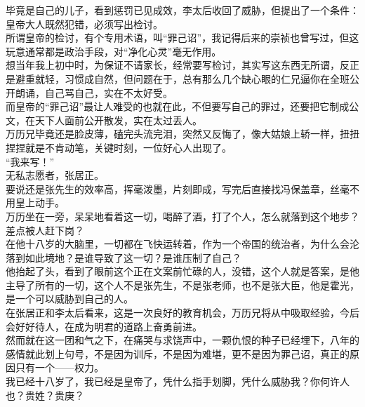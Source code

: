 \begin{multicols}{\theparacolNo}
毕竟是自己的儿子，看到惩罚已见成效，李太后收回了威胁，但提出了一个条件：皇帝大人既然犯错，必须写出检讨。\\

所谓皇帝的检讨，有个专用术语，叫“罪己诏”，我记得后来的崇祯也曾写过，但这玩意通常都是政治手段，对“净化心灵”毫无作用。\\

想当年我上初中时，为保证不请家长，经常要写检讨，其实写这东西无所谓，反正是避重就轻，习惯成自然，但问题在于，总有那么几个缺心眼的仁兄逼你在全班公开朗诵，自己骂自己，实在不太好受。\\

而皇帝的“罪己诏”最让人难受的也就在此，不但要写自己的罪过，还要把它制成公文，在天下人面前公开散发，实在太过丢人。\\

万历兄毕竟还是脸皮薄，磕完头流完泪，突然又反悔了，像大姑娘上轿一样，扭扭捏捏就是不肯动笔，关键时刻，一位好心人出现了。\\

“我来写！”\\

无私志愿者，张居正。\\

要说还是张先生的效率高，挥毫泼墨，片刻即成，写完后直接找冯保盖章，丝毫不用皇上动手。\\

万历坐在一旁，呆呆地看着这一切，喝醉了酒，打了个人，怎么就落到这个地步？差点被人赶下岗？\\

在他十八岁的大脑里，一切都在飞快运转着，作为一个帝国的统治者，为什么会沦落到如此境地？是谁导致了这一切？是谁压制了自己？\\

他抬起了头，看到了眼前这个正在文案前忙碌的人，没错，这个人就是答案，是他主导了所有的一切，这个人不是张先生，不是张老师，也不是张大臣，他是霍光，是一个可以威胁到自己的人。\\

在张居正和李太后看来，这是一次良好的教育机会，万历兄将从中吸取经验，今后会好好待人，在成为明君的道路上奋勇前进。\\

然而就在这一团和气之下，在痛哭与求饶声中，一颗仇恨的种子已经埋下，八年的感情就此划上句号，不是因为训斥，不是因为难堪，更不是因为罪己诏，真正的原因只有一个——权力。\\

我已经十八岁了，我已经是皇帝了，凭什么指手划脚，凭什么威胁我？你何许人也？贵姓？贵庚？\\


\end{multicols}
